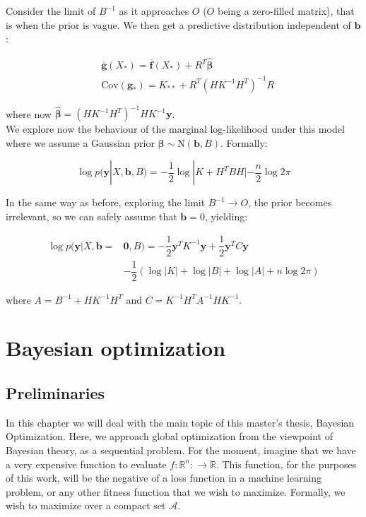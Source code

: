 \documentclass[10pt,a4paper,twoside]{book}
\begin{document}
Consider the limit of $B^{-1}$ as it approaches $O$ ($O$ being a zero-filled matrix), that is when the prior is vague. We then get a predictive distribution independent of $\boldsymbol{b}$:

\begin{align}
&\overline{\boldsymbol{g}}(X_*) = \overline{\boldsymbol{f}}(X_*) + R^T\hat{\boldsymbol{\beta}}\\
&\mathrm{Cov}(\boldsymbol{g_*}) = K_{**} + R^T\left(HK^{-1}H^T\right)^{-1}R
\end{align}

where now $\hat{\boldsymbol{\beta}} = \left(HK^{-1}H^T\right)^{-1}HK^{-1}\boldsymbol{y}$.\\

We explore now the behaviour of the marginal log-likelihood under this model where we assume a Gaussian prior $\boldsymbol{\beta} \sim \mathrm{N}(\boldsymbol{b}, B)$. Formally:

\begin{equation}
\log p(\boldsymbol{y}|X, \boldsymbol{b}, B) = -\dfrac{1}{2}\log |K + H^T B H| - \dfrac{n}{2}\log 2\pi
\end{equation}

In the same way as before, exploring the limit $B^{-1} \rightarrow O$, the prior becomes irrelevant, so we can safely assume that $\boldsymbol{b} = 0$, yielding:

\begin{align}
\log p(\boldsymbol{y}|X, \boldsymbol{b} =& \boldsymbol{0}, B) = -\dfrac{1}{2}\boldsymbol{y}^T K^{-1}\boldsymbol{y} + \dfrac{1}{2}\boldsymbol{y}^T C \boldsymbol{y}\\
&- \dfrac{1}{2}\left(\log |K| + \log |B| + \log |A| + n\log 2\pi \right)
\end{align}

where $A = B^{-1} + HK^{-1}H^T$ and $C = K^{-1}H^T A^{-1}HK^{-1}$.

\chapter{Bayesian optimization}

\section{Preliminaries}

In this chapter we will deal with the main topic of this master's thesis, Bayesian Optimization. Here, we approach global optimization from the viewpoint of Bayesian theory, as a sequential problem. For the moment, imagine that we have a very expensive function to evaluate $f:\mathbb{R}^n: \rightarrow \mathbb{R}$. This function, for the purposes of this work, will be the negative of a loss function in a machine learning problem, or any other fitness function that we wish to maximize. Formally, we wish to maximize over a compact set $\mathcal{A}$.
\end{document}
